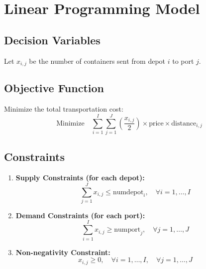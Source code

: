\documentclass{article}
\begin{document}
\section*{Linear Programming Model}

\subsection*{Decision Variables}
Let \( x_{i,j} \) be the number of containers sent from depot \( i \) to port \( j \).

\subsection*{Objective Function}
Minimize the total transportation cost:
\[
\text{Minimize} \quad \sum_{i=1}^{I} \sum_{j=1}^{J} \left(\frac{x_{i,j}}{2}\right) \times \text{price} \times \text{distance}_{i,j}
\]

\subsection*{Constraints}
\begin{enumerate}
    \item \textbf{Supply Constraints (for each depot):}
    \[
    \sum_{j=1}^{J} x_{i,j} \leq \text{numdepot}_i, \quad \forall i = 1, \ldots, I
    \]
    \item \textbf{Demand Constraints (for each port):}
    \[
    \sum_{i=1}^{I} x_{i,j} \geq \text{numport}_j, \quad \forall j = 1, \ldots, J
    \]
    \item \textbf{Non-negativity Constraint:}
    \[
    x_{i,j} \geq 0, \quad \forall i = 1, \ldots, I, \quad \forall j = 1, \ldots, J
    \]
\end{enumerate}
\end{document}
